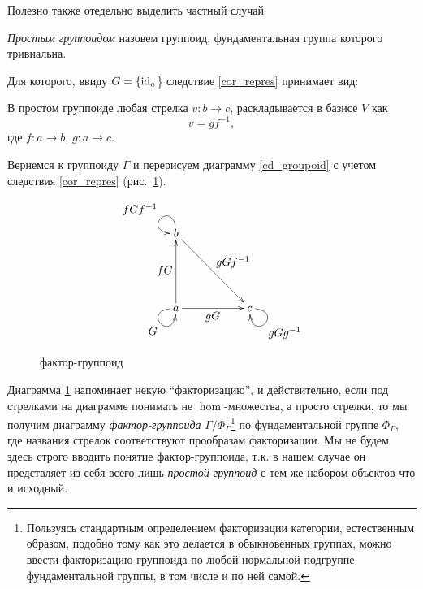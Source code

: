     Полезно также отедельно выделить частный случай

    \begin{definition}
        \emph{Простым группоидом} назовем группоид, фундаментальная группа 
        которого тривиальна.
    \end{definition}

    Для которого, ввиду $G = \{\operatorname*{id}_a$\} следствие \ref{cor_repres} принимает вид:

    \begin{corollary}
        В простом группоиде любая стрелка $v : b \to c$, раскладывается в 
        базисе $V$ как
        \[v = gf^{-1},\]
        где $f : a \to b$, $g : a \to c$.
    \end{corollary}

    \bigskip

    Вернемся к группоиду $\Gamma$ и перерисуем диаграмму \ref{cd_groupoid} с 
    учетом следствия \ref{cor_repres} (рис.~\ref{cd_groupoid_repres}).

    \bigskip
    
    \begin{figure}[h]
        \centering
        \[\xymatrix{
            b \ar@(u,l)[]_{\textstyle fGf^{-1}} \ar[ddrr]^{\textstyle gGf^{-1}}             & &                             \\
                                                                                            & &                             \\
            a \ar@(l,d)[]_{\textstyle G} \ar[uu]^{\textstyle fG} \ar[rr]_{\textstyle gG}    & & c \ar@(r,d)[]^{\textstyle gGg^{-1}}
        }\]
        \caption{фактор-группоид}
        \label{cd_groupoid_repres}
    \end{figure}

    Диаграмма \ref{cd_groupoid_repres} напоминает некую ``факторизацию'', и 
    действительно, если под стрелками на диаграмме понимать не $\hom$-множества,
    а просто стрелки, то мы получим диаграмму \emph{фактор-группоида} 
    $\Gamma/\Phi_\Gamma$\footnote{Пользуясь стандартным 
    определением факторизации категории\cite{MacLane}, естественным
    образом, подобно тому как это делается в обыкновенных группах, можно ввести 
    факторизацию группоида по любой нормальной подгруппе фундаментальной 
    группы, в том числе и по ней самой.} по фундаментальной группе $\Phi_\Gamma$, 
    где названия стрелок соответствуют прообразам 
    факторизации. Мы не будем здесь строго вводить понятие фактор-группоида, 
    т.к. в нашем случае он предствляет из себя всего лишь \emph{простой 
    группоид} с тем же набором объектов что и исходный.

